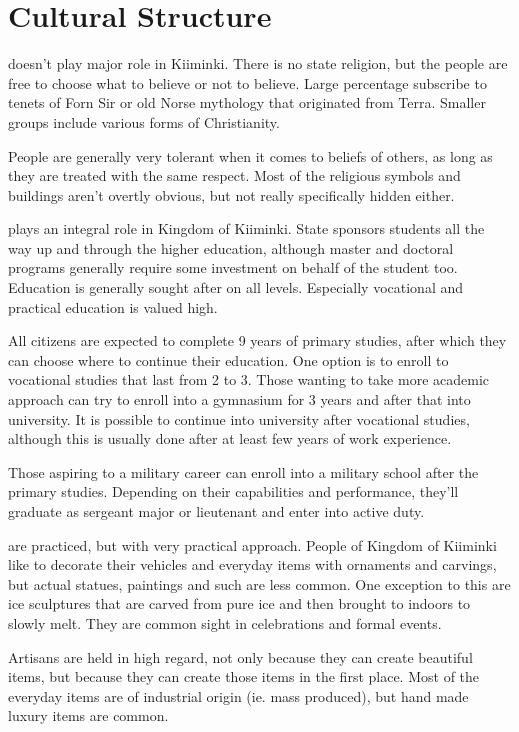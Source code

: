 \documentclass{tufte-book}
\begin{document}
\section{Cultural Structure}
\label{sc:cultural-structure}

 doesn't play major role in Kiiminki. There is no state
religion, but the people are free to choose what to believe or not to believe.
Large percentage subscribe to tenets of Forn Si\dh r or old Norse mythology
that originated from Terra. Smaller groups include various forms of
Christianity.

People are generally very tolerant when it comes to beliefs of others, as long
as they are treated with the same respect. Most of the religious symbols and
buildings aren't overtly obvious, but not really specifically hidden either.

 plays an integral role in Kingdom of Kiiminki. State
sponsors students all the way up and through the higher education, although
master and doctoral programs generally require some investment on behalf of
the student too. Education is generally sought after on all levels. Especially
vocational and practical education is valued high.

All citizens are expected to complete 9 years of primary studies, after
which they can choose where to continue their education. One option is to
enroll to vocational studies that last from 2 to 3. Those wanting to take more
academic approach can try to enroll into a gymnasium for 3 years and after
that into university. It is possible to continue into university after
vocational studies, although this is usually done after at least few years of
work experience.

Those aspiring to a military career can enroll into a military school after
the primary studies. Depending on their capabilities and performance, they'll
graduate as sergeant major or lieutenant and enter into active duty.

 are practiced, but with very practical approach. People of
Kingdom of Kiiminki like to decorate their vehicles and everyday items with
ornaments and carvings, but actual statues, paintings and such are less
common. One exception to this are ice sculptures that are carved from pure ice
and then brought to indoors to slowly melt. They are common sight in
celebrations and formal events.

Artisans are held in high regard, not only because they can create beautiful
items, but because they can create those items in the first place. Most of the
everyday items are of industrial origin (ie. mass produced), but hand made
luxury items are common.
\end{document}
